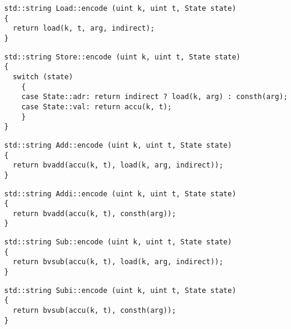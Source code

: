 
\begin{lstlisting}[style=c++, style=encode]
std::string Load::encode (uint k, uint t, State state)
{
  return load(k, t, arg, indirect);
}
\end{lstlisting}


\begin{lstlisting}[style=c++, style=encode]
std::string Store::encode (uint k, uint t, State state)
{
  switch (state)
    {
    case State::adr: return indirect ? load(k, arg) : consth(arg);
    case State::val: return accu(k, t);
    }
}
\end{lstlisting}


\begin{lstlisting}[style=c++, style=encode]
std::string Add::encode (uint k, uint t, State state)
{
  return bvadd(accu(k, t), load(k, arg, indirect));
}
\end{lstlisting}


\begin{lstlisting}[style=c++, style=encode]
std::string Addi::encode (uint k, uint t, State state)
{
  return bvadd(accu(k, t), consth(arg));
}
\end{lstlisting}


\begin{lstlisting}[style=c++, style=encode]
std::string Sub::encode (uint k, uint t, State state)
{
  return bvsub(accu(k, t), load(k, arg, indirect));
}
\end{lstlisting}


\begin{lstlisting}[style=c++, style=encode]
std::string Subi::encode (uint k, uint t, State state)
{
  return bvsub(accu(k, t), consth(arg));
}
\end{lstlisting}

